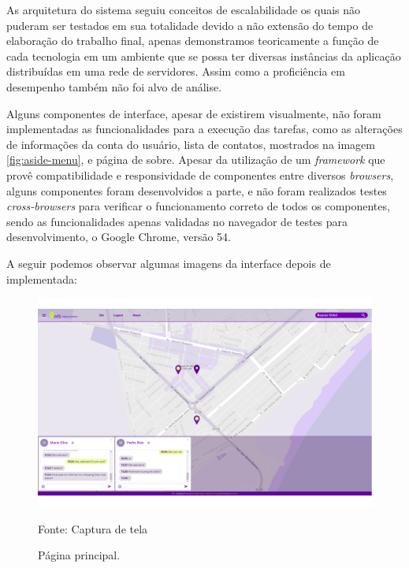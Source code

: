 As arquitetura do sistema seguiu conceitos de escalabilidade os quais não puderam ser testados em sua totalidade devido a não extensão do tempo de elaboração do trabalho final, apenas demonstramos teoricamente a função de cada tecnologia em um ambiente que se possa ter diversas instâncias da aplicação distribuídas em uma rede de servidores. Assim como a proficiência em desempenho também não foi alvo de análise.

Alguns componentes de interface, apesar de existirem visualmente, não foram implementadas as funcionalidades para a execução das tarefas, como as alterações de informações da conta do usuário, lista de contatos, mostrados na imagem \ref{fig:aside-menu}, e página de sobre. Apesar da utilização de um \textit{framework} que provê compatibilidade e responsividade de componentes entre diversos \textit{browsers}, alguns componentes foram desenvolvidos a parte, e não foram realizados testes \textit{cross-browsers} para verificar o funcionamento correto de todos os componentes, sendo as funcionalidades apenas validadas no navegador de testes para desenvolvimento, o Google Chrome, versão 54.

A seguir podemos observar algumas imagens da interface depois de implementada:

\begin{figure}[H]
	\centering
	\includegraphics[scale=0.32]{imagens/pagina.png}
	\caption{\small Página principal.} Fonte: Captura de tela
	\label{fig:pagina}
\end{figure}

